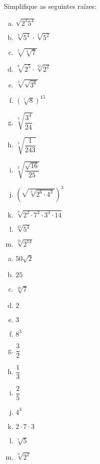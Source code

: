 \begin{secExercicios}
\begin{exer}
Simplifique as seguintes raízes:
\begin{multicols}{2}
\begin{enumerate}[a)]
\item $\sqrt{2^3 5^4}$
\item $\sqrt[3]{5^4} \cdot \sqrt[3]{5^2}$
\item $\sqrt[5]{\sqrt[4]{7}}$
\item $\sqrt[6]{2^5} \cdot \sqrt[12]{2^2}$
\item $\sqrt[3]{\sqrt{3^6}}$
\item $(\sqrt[5]{8})^{15}$
\item $\sqrt[3]{\dfrac{3^4}{24}}$
\item $\sqrt[5]{\dfrac{1}{243}}$
\item $\sqrt[2]{\dfrac{\sqrt{16}}{25}}$
\item $(\sqrt{\sqrt[3]{2^6 \cdot 4^3}})^3$
\item $\sqrt[3]{2^2 \cdot 7^2 \cdot 3^3 \cdot 14}$
\item $\sqrt[21]{5^3}$
\item $\sqrt[21]{2^{14}}$
\end{enumerate}
\end{multicols}
\end{exer}
\begin{resp}
\begin{multicols}{4}
\begin{enumerate}[a)]
\item $50\sqrt{2}$
\item $25$
\item $\sqrt[20]{7}$
\item $2$
\item $3$
\item $8^3$
\item $\dfrac{3}{2}$
\item $\dfrac{1}{3}$
\item $\dfrac{2}{5}$
\item $4^3$
\item $2 \cdot 7 \cdot 3$
\item $\sqrt[7]{5}$
\item $\sqrt[3]{2^{2}}$
\end{enumerate}
\end{multicols}
\end{resp}


\end{secExercicios}
